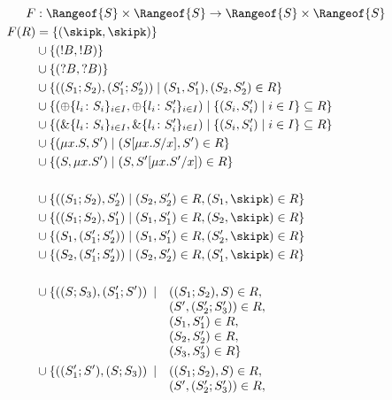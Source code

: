 \begin{figure}[tp]
  \begin{align*}
    F &:  \Rangeof{S} \times \Rangeof{S} \to \Rangeof{S} \times \Rangeof{S} \\
    F (R) &= \{ (\skipk, \skipk) \} \\
    & \cup \{ (!B, !B) \} \\
    & \cup \{ (?B, ?B) \} \\
    & \cup \{ ((S_1; S_2), (S_1'; S_2')) \mid (S_1, S_1'), (S_2, S_2') \in R \} \\
    & \cup \{ (\oplus\{l_i\colon S_i\}_{i\in I}, \oplus\{l_i\colon S_i'\}_{i\in I}) \mid \{ (S_i, S_i') \mid i\in I\} \subseteq R \} \\
    & \cup \{ (\&\{l_i\colon S_i\}_{i\in I}, \&\{l_i\colon S_i'\}_{i\in I}) \mid \{ (S_i, S_i') \mid i\in I\} \subseteq R \} \\
    & \cup \{ (\mu x.S, S') \mid (S[\mu x.S/x], S') \in R \} \\
    & \cup \{ (S, \mu x.S') \mid (S, S'[\mu x.S'/x]) \in R \} \\
            &\\
    & \cup \{ ((S_1; S_2), S_2') \mid (S_2, S_2') \in R, (S_1, \skipk) \in R \} \\
    & \cup \{ ((S_1; S_2), S_1') \mid (S_1, S_1') \in R, (S_2, \skipk) \in R \} \\
    & \cup \{ (S_1, (S_1'; S_2')) \mid (S_1, S_1') \in R, (S_2', \skipk) \in R \} \\
    & \cup \{ (S_2, (S_1'; S_2')) \mid (S_2, S_2') \in R, (S_1', \skipk) \in R \} \\
    \\
      & \cup \{ ((S;S_3),(S_1';S'))
        \begin{array}[t]{ll}
          \mid
          & ((S_1;S_2), S) \in R,\\
          & (S',(S_2';S_3')) \in R, \\
          & (S_1, S_1') \in R,\\
          & (S_2, S_2') \in R,\\
          & (S_3, S_3') \in R\}
        \end{array}
    \\
      & \cup \{ ((S_1';S'),(S;S_3))
        \begin{array}[t]{ll}
          \mid
          & ((S_1;S_2), S) \in R,\\
          & (S',(S_2';S_3')) \in R, \\

\end{array}
\end{align*}
\end{figure}
